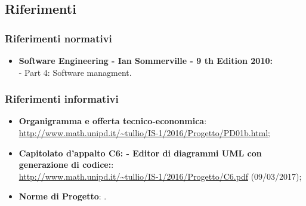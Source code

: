 \documentclass[../PianoDiProgetto.tex]{subfiles}
\begin{document}
		\subsection{Riferimenti}
			\subsubsection{Riferimenti normativi}
    			\begin{itemize}
    			\item \textbf{Software Engineering - Ian Sommerville - 9 th Edition 2010:} \\
    			- Part 4: Software managment. \\
			\end{itemize}
			\subsubsection{Riferimenti informativi}	
				\begin{itemize}
					\item \textbf{Organigramma e offerta tecnico-econonmica}:\\
					\url{http://www.math.unipd.it/~tullio/IS-1/2016/Progetto/PD01b.html};
					\item \textbf{Capitolato d'appalto C6: \progetto - Editor di diagrammi UML con 							generazione di codice:}:\\
					\url{http://www.math.unipd.it/~tullio/IS-1/2016/Progetto/C6.pdf} (09/03/2017);
					\item \textbf{Norme di Progetto}: \normediprogettov.
				\end{itemize}
\end{document}
